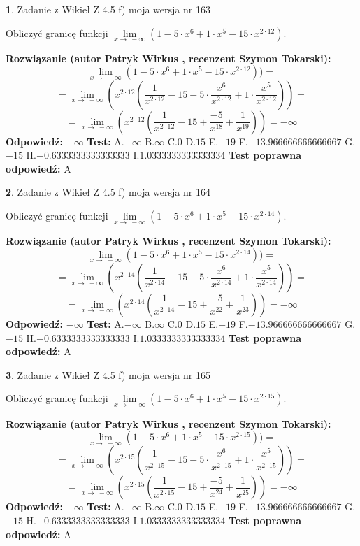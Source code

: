 \documentclass[12pt, a4paper]{article}
\theoremstyle{definition} %
\newtheorem{zad}{}
\newcommand{\zadStart}[1]{\begin{zad}#1\newline}
\newcommand{\zadStop}{\end{zad}}
\newcommand{\rozwStart}[2]{\noindent \textbf{Rozwiązanie (autor #1 , recenzent #2): }\newline}
\newcommand{\rozwStop}{\newline}
\newcommand{\odpStart}{\noindent \textbf{Odpowiedź:}\newline}
\newcommand{\odpStop}{\newline}
\newcommand{\testStart}{\noindent \textbf{Test:}\newline}
\newcommand{\testStop}{\newline}
\newcommand{\kluczStart}{\noindent \textbf{Test poprawna odpowiedź:}\newline}
\newcommand{\kluczStop}{\newline}
\begin{document}
\zadStart{Zadanie z Wikieł Z 4.5 f) moja wersja nr 163}


Obliczyć granicę funkcji  $\lim\limits_{x\to\ -\infty}(1 - 5 \cdot x^{6}+1 \cdot x^{5}- 15 \cdot x^{2\cdot12})$.
\zadStop
\rozwStart{Patryk Wirkus}{Szymon Tokarski}
$$\lim\limits_{x\to\ -\infty}(1 - 5 \cdot x^{6}+1 \cdot x^{5}- 15 \cdot x^{2\cdot12}))=$$
$$=\lim\limits_{x\to\ -\infty}(x^{2\cdot12}(\frac{1}{x^{2\cdot12}}-15 -5 \cdot \frac{x^{6}}{x^{2\cdot12}}+1 \cdot \frac{x^{5}}{x^{2\cdot12}}))=$$
$$=\lim\limits_{x\to\ -\infty}(x^{2\cdot12}(\frac{1}{x^{2\cdot12}}-15 + \frac{-5}{x^{18}}+ \frac{1}{x^{19}}))=-\infty$$
\rozwStop
\odpStart
$-\infty$
\odpStop
\testStart
A.$-\infty$ B.$\infty$ C.$0$ D.$15$ E.$-19$
F.$-13.966666666666667$ G.$-15$
H.$-0.6333333333333333$
I.$1.0333333333333334$
\testStop
\kluczStart
A
\kluczStop



\zadStart{Zadanie z Wikieł Z 4.5 f) moja wersja nr 164}


Obliczyć granicę funkcji  $\lim\limits_{x\to\ -\infty}(1 - 5 \cdot x^{6}+1 \cdot x^{5}- 15 \cdot x^{2\cdot14})$.
\zadStop
\rozwStart{Patryk Wirkus}{Szymon Tokarski}
$$\lim\limits_{x\to\ -\infty}(1 - 5 \cdot x^{6}+1 \cdot x^{5}- 15 \cdot x^{2\cdot14}))=$$
$$=\lim\limits_{x\to\ -\infty}(x^{2\cdot14}(\frac{1}{x^{2\cdot14}}-15 -5 \cdot \frac{x^{6}}{x^{2\cdot14}}+1 \cdot \frac{x^{5}}{x^{2\cdot14}}))=$$
$$=\lim\limits_{x\to\ -\infty}(x^{2\cdot14}(\frac{1}{x^{2\cdot14}}-15 + \frac{-5}{x^{22}}+ \frac{1}{x^{23}}))=-\infty$$
\rozwStop
\odpStart
$-\infty$
\odpStop
\testStart
A.$-\infty$ B.$\infty$ C.$0$ D.$15$ E.$-19$
F.$-13.966666666666667$ G.$-15$
H.$-0.6333333333333333$
I.$1.0333333333333334$
\testStop
\kluczStart
A
\kluczStop



\zadStart{Zadanie z Wikieł Z 4.5 f) moja wersja nr 165}


Obliczyć granicę funkcji  $\lim\limits_{x\to\ -\infty}(1 - 5 \cdot x^{6}+1 \cdot x^{5}- 15 \cdot x^{2\cdot15})$.
\zadStop
\rozwStart{Patryk Wirkus}{Szymon Tokarski}
$$\lim\limits_{x\to\ -\infty}(1 - 5 \cdot x^{6}+1 \cdot x^{5}- 15 \cdot x^{2\cdot15}))=$$
$$=\lim\limits_{x\to\ -\infty}(x^{2\cdot15}(\frac{1}{x^{2\cdot15}}-15 -5 \cdot \frac{x^{6}}{x^{2\cdot15}}+1 \cdot \frac{x^{5}}{x^{2\cdot15}}))=$$
$$=\lim\limits_{x\to\ -\infty}(x^{2\cdot15}(\frac{1}{x^{2\cdot15}}-15 + \frac{-5}{x^{24}}+ \frac{1}{x^{25}}))=-\infty$$
\rozwStop
\odpStart
$-\infty$
\odpStop
\testStart
A.$-\infty$ B.$\infty$ C.$0$ D.$15$ E.$-19$
F.$-13.966666666666667$ G.$-15$
H.$-0.6333333333333333$
I.$1.0333333333333334$
\testStop
\kluczStart
A
\kluczStop
\end{document}
